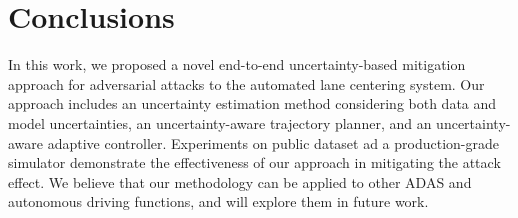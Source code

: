 \documentclass[letterpaper, 10 pt, conference]{ieeeconf}
\begin{document}
\begin{comment}
\subsection{Uncertainty Aware Autonomous Systems}
A robust design for autonomous systems must consider various uncertainty such as the inherent uncertainties from the dynamic environment, the disturbances to system operations from environment interference, transient errors, and malicious attacks ~\cite{zhu2021safe}. In sensing and perception stage, the work\cite{nakashima2020uncertainty} propose a method to utilize estimated uncertainty as a threshold to decide which sensor is reliable. In prediction and planning stage, the work\cite{hu2018probabilistic} proposed a method using mixture density network to estimate the intentions, location and time information for surrounding vehicles. In original OpenPilot, Multiple Hypothesis Prediction\cite{rupprecht2017learning} is utilized to estimate the confidence of prediction. There are also works design stochastic motion controller considering uncertainty\cite{suh2018stochastic}. In our work, we combine the different methods to estimate confidence and quantify uncertainty, and then utilize the  uncertainty to design adaptive planner and controller in a cross-layer way. 
\end{comment}






\section{Conclusions}

In this work, we proposed a novel end-to-end uncertainty-based mitigation approach for adversarial attacks to the automated lane centering system. Our approach includes an uncertainty estimation method considering both data and model uncertainties, an uncertainty-aware trajectory planner, and an uncertainty-aware adaptive controller. Experiments on public dataset ad a production-grade simulator demonstrate the effectiveness of our approach in mitigating the attack effect. We believe that our methodology can be applied to other ADAS and autonomous driving functions, and will explore them in future work.


\end{document}
